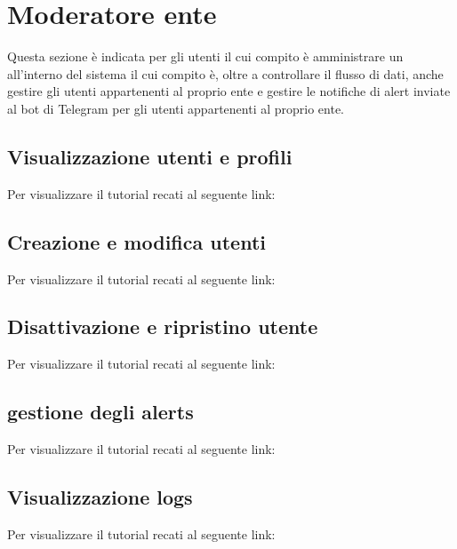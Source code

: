 \section{Moderatore ente}
Questa sezione è indicata per gli utenti il cui compito è amministrare un  all'interno del sistema il cui compito è, oltre a controllare il flusso di dati, anche gestire gli utenti appartenenti al proprio ente e gestire le notifiche di alert inviate al bot di Telegram per gli utenti appartenenti al proprio ente.

\subsection{Visualizzazione utenti e profili}
Per visualizzare il tutorial recati al seguente link: 
\url{}

\subsection{Creazione e modifica utenti}
Per visualizzare il tutorial recati al seguente link: 
\url{}

\subsection{Disattivazione e ripristino utente}
Per visualizzare il tutorial recati al seguente link: 
\url{}

\subsection{gestione degli alerts}
Per visualizzare il tutorial recati al seguente link: 
\url{}

\subsection{Visualizzazione logs}
Per visualizzare il tutorial recati al seguente link: 
\url{}
